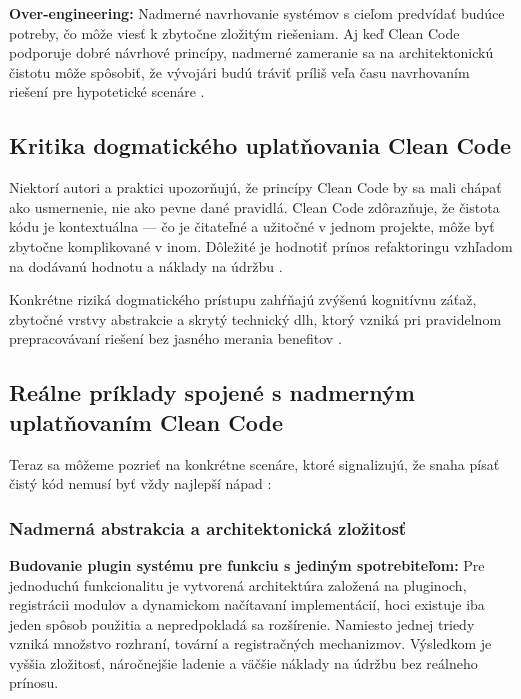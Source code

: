 \noindent\textbf{Over-engineering:} Nadmerné navrhovanie systémov s cieľom predvídať budúce potreby, čo môže viesť k zbytočne zložitým riešeniam. Aj keď Clean Code podporuje dobré návrhové princípy, nadmerné zameranie sa na architektonickú čistotu môže spôsobiť, že vývojári budú tráviť príliš veľa času navrhovaním riešení pre hypotetické scenáre \cite{CLEANCODE_MARTIN2008}. 


\subsection{Kritika dogmatického uplatňovania Clean Code}

Niektorí autori a praktici upozorňujú, že princípy Clean Code by sa mali chápať ako usmernenie, nie ako pevne dané pravidlá. Clean Code zdôrazňuje, že čistota kódu je kontextuálna — čo je čitateľné a užitočné v jednom projekte, môže byť zbytočne komplikované v inom. Dôležité je hodnotiť prínos refaktoringu vzhľadom na dodávanú hodnotu a náklady na údržbu \cite{CLEANCODE_SAM2011}.

Konkrétne riziká dogmatického prístupu zahŕňajú zvýšenú kognitívnu záťaž, zbytočné vrstvy abstrakcie a skrytý technický dlh, ktorý vzniká pri pravidelnom prepracovávaní riešení bez jasného merania benefitov \cite{HIDDENCOST_KESWANI2025}.

\subsection{Reálne príklady spojené s nadmerným uplatňovaním Clean Code}

Teraz sa môžeme pozrieť na konkrétne scenáre, ktoré signalizujú, že snaha písať čistý kód nemusí byť vždy najlepší nápad \cite{HIDDENCOST_KESWANI2025,REDDIT_CLEANCODE2025}:

\subsubsection{Nadmerná abstrakcia a architektonická zložitosť}

\textbf{Budovanie plugin systému pre funkciu s jediným spotrebiteľom:} Pre jednoduchú funkcionalitu je vytvorená architektúra založená na pluginoch, registrácii modulov a dynamickom načítavaní implementácií, hoci existuje iba jeden spôsob použitia a nepredpokladá sa rozšírenie. Namiesto jednej triedy vzniká množstvo rozhraní, tovární a registračných mechanizmov. Výsledkom je vyššia zložitosť, náročnejšie ladenie a väčšie náklady na údržbu bez reálneho prínosu.
    
